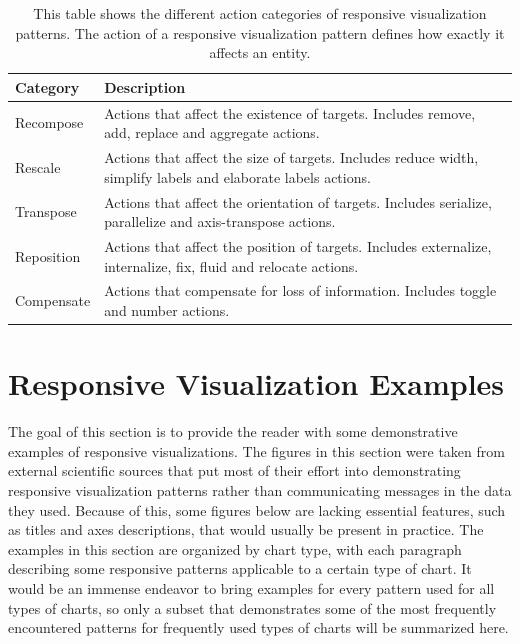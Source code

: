 \begin{table}[tp]
    \centering
    \begin{tabularx}{\linewidth}{| l | X |}
        \hline
        \textbf{Category} & \textbf{Description} \\ \hline
        Recompose & Actions that affect the existence of targets. Includes remove, add, replace and aggregate actions. \\
        \hline
        Rescale & Actions that affect the size of targets. Includes reduce width, simplify labels and elaborate labels actions. \\
        \hline
        Transpose & Actions that affect the orientation of targets. Includes serialize, parallelize and axis-transpose actions. \\
        \hline
        Reposition & Actions that affect the position of targets. Includes externalize, internalize, fix, fluid and relocate actions. \\
        \hline
        Compensate & Actions that compensate for loss of information. Includes toggle and number actions. \\
        \hline
    \end{tabularx}
    \caption[Actions of Responsive Visualization Patterns]
    {
        This table shows the different action categories of responsive visualization patterns. The action of a responsive visualization pattern defines how exactly it affects an entity.
    }
    \label{tab:PatternsActions}
\end{table}

\section{Responsive Visualization Examples}

The goal of this section is to provide the reader with some demonstrative examples of responsive visualizations. The figures in this section were taken from external scientific sources that put most of their effort into demonstrating responsive visualization patterns rather than communicating messages in the data they used. Because of this, some figures below are lacking essential features, such as titles and axes descriptions, that would usually be present in practice. The examples in this section are organized by chart type, with each paragraph describing some responsive patterns applicable to a certain type of chart. It would be an immense endeavor to bring examples for every pattern used for all types of charts, so only a subset that demonstrates some of the most frequently encountered patterns for frequently used types of charts will be summarized here.

